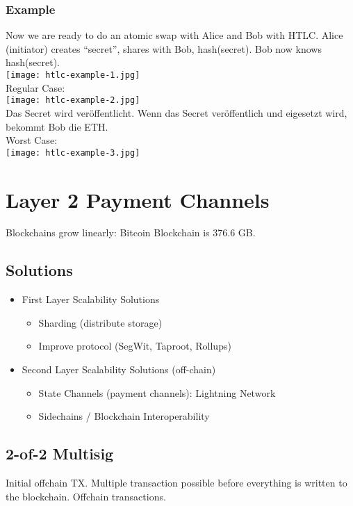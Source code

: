\subsubsection{Example}
Now we are ready to do an atomic swap with Alice and Bob with HTLC.
Alice (initiator) creates “secret”, shares with Bob, hash(secret).
Bob now knows hash(secret).\\
\texttt{[image: htlc-example-1.jpg]}\\
Regular Case:\\
\texttt{[image: htlc-example-2.jpg]}\\
Das Secret wird veröffentlicht. Wenn das Secret veröffentlich und eigesetzt wird, bekommt Bob die ETH.\\
Worst Case:\\
\texttt{[image: htlc-example-3.jpg]}





\section{Layer 2 Payment Channels}
Blockchains grow linearly: Bitcoin Blockchain is 376.6 GB.
\subsection{Solutions}
\begin{itemize}
  \item First Layer Scalability Solutions
  \begin{itemize}
    \item Sharding (distribute storage)
    \item Improve protocol (SegWit, Taproot, Rollups)
  \end{itemize}
  \item Second Layer Scalability Solutions (off-chain)
  \begin{itemize}
    \item State Channels (payment channels): Lightning Network
    \item Sidechains / Blockchain Interoperability
  \end{itemize}
\end{itemize}

\subsection{2-of-2 Multisig}
Initial offchain TX.
Multiple transaction possible before everything is written to the blockchain.
Offchain transactions.
